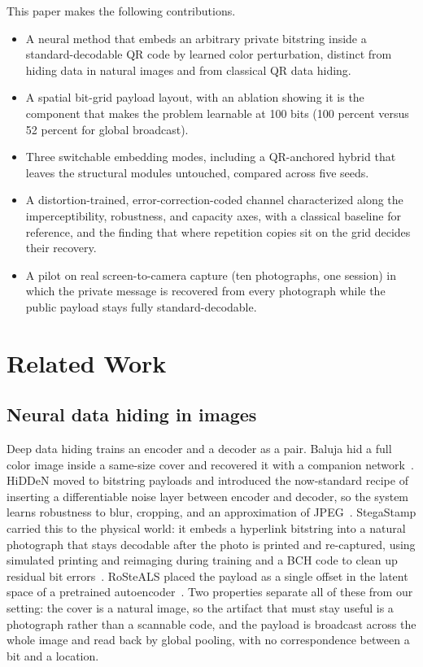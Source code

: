 \documentclass[conference]{IEEEtran}
\begin{document}
This paper makes the following contributions.
\begin{itemize}
\item A neural method that embeds an arbitrary private bitstring inside a
standard-decodable QR code by learned color perturbation, distinct from hiding data in
natural images and from classical QR data hiding.
\item A spatial bit-grid payload layout, with an ablation showing it is the component
that makes the problem learnable at 100 bits (100 percent versus 52 percent for global
broadcast).
\item Three switchable embedding modes, including a QR-anchored hybrid that leaves the
structural modules untouched, compared across five seeds.
\item A distortion-trained, error-correction-coded channel characterized along the
imperceptibility, robustness, and capacity axes, with a classical baseline for reference,
and the finding that where repetition copies sit on the grid decides their recovery.
\item A pilot on real screen-to-camera capture (ten photographs, one session) in which
the private message is recovered from every photograph while the public payload stays
fully standard-decodable.
\end{itemize}

\section{Related Work}

\subsection{Neural data hiding in images}
Deep data hiding trains an encoder and a decoder as a pair. Baluja hid a full color
image inside a same-size cover and recovered it with a companion
network~\cite{baluja2017hiding}. HiDDeN moved to bitstring payloads and introduced the
now-standard recipe of inserting a differentiable noise layer between encoder and
decoder, so the system learns robustness to blur, cropping, and an approximation of
JPEG~\cite{zhu2018hidden}. StegaStamp carried this to the physical world: it embeds a
hyperlink bitstring into a natural photograph that stays decodable after the photo is
printed and re-captured, using simulated printing and reimaging during training and a
BCH code to clean up residual bit errors~\cite{tancik2020stegastamp}. RoSteALS placed
the payload as a single offset in the latent space of a pretrained
autoencoder~\cite{bui2023rosteals}. Two properties separate all of these from our setting:
the cover is a natural image, so the artifact that must stay useful is a photograph rather
than a scannable code, and the payload is broadcast across the whole image and read back
by global pooling, with no correspondence between a bit and a location.
\end{document}
